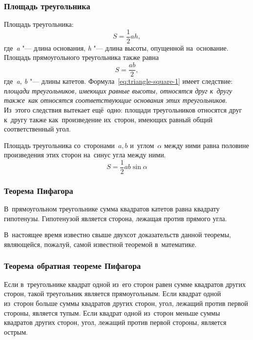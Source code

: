 \documentclass[]{scrartcl}
\begin{document}
\subsubsection{Площадь треугольника}
Площадь треугольника:
\begin{equation}\label{eq:triangle-square-1}
S=\frac{1}{2}ah,
\end{equation} 
где~\textit{a} "--- длина основания, \textit{h} "--- длина высоты, опущенной на~основание.
Площадь прямоугольного треугольника также равна
\begin{equation}\label{eq:triangle-square-2}
S=\frac{ab}{2},
\end{equation}
где~\textit{a, b} "--- длины катетов.
Формула~\ref{eq:triangle-square-1} имеет следствие: \emph{площади треугольников, имеющих равные высоты, относятся друг к~другу также~как относятся соответствующие основания этих треугольников}. Из~этого следствия вытекает ещё~одно: площади треугольников относятся друг к~другу также как~произведение их~сторон, имеющих равный общий соответственный угол.

\begin{theorem}
	Площадь треугольника со~сторонами~${\textstyle a,b}$ и~углом~${\alpha}$ между ними равна половине произведения этих сторон на~синус угла между ними.
	\begin{equation}\label{eq:triangle-square-theorem}
	S=\frac{1}{2}ab \sin \alpha
	\end{equation} 
\end{theorem}

\subsubsection{Теорема Пифагора}
\begin{theorem}
	В~прямоугольном треугольнике сумма квадратов катетов равна квадрату гипотенузы. Гипотенузой является сторона, лежащая против прямого угла.
\end{theorem}
 В~настоящее время известно свыше двухсот  доказательств данной теоремы, являющейся, пожалуй, самой известной теоремой в~математике. 
 
\subsubsection{Теорема обратная теореме Пифагора}
\begin{theorem}
	Если в~треугольнике квадрат одной из~его сторон равен сумме квадратов других сторон, такой треугольник является прямоугольным. Если квадрат одной из~сторон больше суммы квадратов других сторон, угол, лежащий против первой стороны, является тупым. Если квадрат одной из~сторон меньше суммы квадратов других сторон, угол, лежащий против первой стороны, является острым.
\end{theorem}
\end{document}

